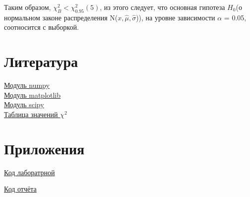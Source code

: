 \documentclass[a4]{article}
\begin{document}
		Таким образом, $\chi^2_B < \chi^2_{0.95}(5)$, из этого следует, что основная гипотеза $H_0$(о нормальном законе распределения N($x, \hat{\mu}, \hat{\sigma}$)), на уровне зависимости $\alpha$ = 0.05, соотносится с выборкой.
	\section{Литература}
	
	\href{https://physics.susu.ru/vorontsov/language/numpy.html}{Модуль numpy}\\
	
	\href{https://matplotlib.org/}{Модуль matplotlib}\\
	
	\href{https://www.scipy.org/}{Модуль scipy}\\
	
	\href{https://ru.wikipedia.org/wiki/%D0%9A%D0%B2%D0%B0%D0%BD%D1%82%D0%B8%D0%BB%D0%B8_%D1%80%D0%B0%D1%81%D0%BF%D1%80%D0%B5%D0%B4%D0%B5%D0%BB%D0%B5%D0%BD%D0%B8%D1%8F_%D1%85%D0%B8-%D0%BA%D0%B2%D0%B0%D0%B4%D1%80%D0%B0%D1%82}{Таблица значений $\chi^2$}\\
	
	\section{Приложения}
	
	\href{https://github.com/LuciusGen/Matstat/blob/master/Lab6/Lab7.py}{Код лаборатрной}
	
	\href{https://github.com/LuciusGen/Matstat/blob/master/Lab6/lab7.tex}{Код отчёта}
	
\end{document}
